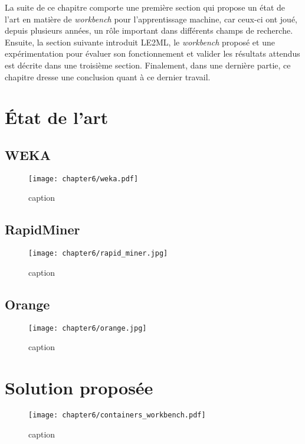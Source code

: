La suite de ce chapitre comporte une première section qui propose un état de l'art en matière de \textit{workbench} pour l'apprentissage machine, car ceux-ci ont joué, depuis plusieurs années, un rôle important dans différents champs de recherche. Ensuite, la section suivante introduit \acs{LE2ML}, le \textit{workbench} proposé et une expérimentation pour évaluer son fonctionnement et valider les résultats attendus est décrite dans une troisième section. Finalement, dans une dernière partie, ce chapitre dresse une conclusion quant à ce dernier travail.

\section{État de l'art}

\subsection{WEKA}

\begin{figure}[H]
	\centering
	\texttt{[image: chapter6/weka.pdf]}
        \caption{caption}
	\label{fig:weka}
\end{figure}

\subsection{RapidMiner}

\begin{figure}[H]
	\centering
	\texttt{[image: chapter6/rapid\_miner.jpg]}
        \caption{caption}
	\label{fig:rapid_miner}
\end{figure}

\subsection{Orange}

\begin{figure}[H]
	\centering
	\texttt{[image: chapter6/orange.jpg]}
        \caption{caption}
	\label{fig:orange}
\end{figure}

\section{Solution proposée}

\begin{figure}[H]
	\centering
	\texttt{[image: chapter6/containers\_workbench.pdf]}
        \caption{caption}
	\label{fig:containers_workbench}
\end{figure}

